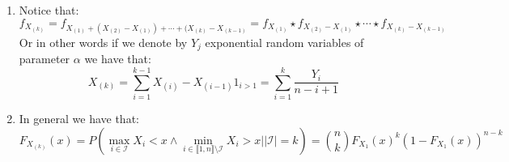\documentclass[10pt,a4paper]{article}
\begin{document}
\begin{enumerate}
\item Notice that:
\[
f_{X_{(k)}} = f_{X_{(1)} + (X_{(2)} - X_{(1)}) + \cdots + (X_{(k)} - X_{(k-1)}} = f_{X_{(1)}} \star f_{X_{(2)} - X_{(1)}} \star \cdots \star f_{X_{(k)} - X_{(k-1)}}
\]
Or in other words if we denote by $Y_j$ exponential random variables of parameter $\alpha$ we have that:
\[
X_{(k)} = \sum_{i = 1}^{k-1} X_{(i)} - X_{(i-1)} 1_{i > 1} = \sum_{i = 1}^k \frac{Y_i}{n - i + 1}
\]

\item In general we have that:
\[
F_{X_{(k)}}(x) = P\left(\max_{i \in \mathcal{I}} X_i < x \land \min_{i \in \llbracket 1, n \rrbracket \setminus \mathcal{I}} X_i > x \big| |\mathcal{I}| = k\right) = \binom{n}{k} F_{X_1}(x)^k (1 - F_{X_1}(x))^{n - k}
\]


\end{enumerate}
\end{document}
